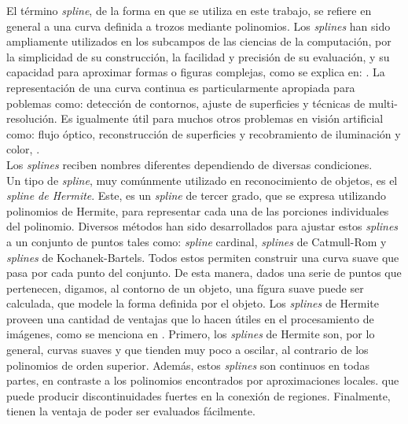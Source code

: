El t\'ermino \emph{spline}, de la forma en que se utiliza en este trabajo, se refiere en general 
a una curva definida a trozos mediante polinomios. Los \emph{splines} han sido ampliamente
utilizados en los subcampos de las ciencias de la computaci\'on, por la simplicidad de su 
construcci\'on, la facilidad y precisi\'on de su evaluaci\'on, y su capacidad para aproximar
formas o figuras complejas, como se explica en: \cite{web:splines}. 
La representaci\'on de una curva continua es particularmente apropiada para poblemas
como: detecci\'on de contornos, ajuste de superficies y t\'ecnicas de multi-resoluci\'on.
Es igualmente \'util para muchos otros problemas en visi\'on artificial como: flujo \'optico,
reconstrucci\'on de superficies y recobramiento de iluminaci\'on y color, \cite[821]{splinespap}.\\

Los \emph{splines} reciben nombres diferentes dependiendo de diversas condiciones.\\
Un tipo de \emph{spline}, muy com\'unmente utilizado en reconocimiento de objetos, es
el \emph{spline de Hermite}. Este, es un \emph{spline} de tercer grado, que se expresa
 utilizando polinomios de Hermite, para representar cada una de las porciones individuales
del polinomio.
Diversos m\'etodos han sido desarrollados para ajustar estos \emph{splines} a un conjunto
de puntos tales como: \emph{spline} cardinal, \emph{splines} de Catmull-Rom y \emph{splines} de
Kochanek-Bartels. Todos estos permiten construir una curva suave que pasa por cada punto
del conjunto. De esta manera, dados una serie de puntos que pertenecen, digamos, al contorno de 
un objeto, una f\'igura suave puede ser calculada, que modele la forma definida por el objeto.
Los \emph{splines} de Hermite proveen una cantidad de ventajas que lo hacen \'utiles 
en el procesamiento de im\'agenes, como se menciona en \cite{splinespap}. Primero,
los \emph{splines} de Hermite son, por lo general, curvas suaves y que tienden muy poco
a oscilar, al contrario de los polinomios de orden superior. Adem\'as, estos \emph{splines} son
continuos en todas partes, en contraste a los polinomios encontrados por aproximaciones locales.
que puede producir discontinuidades fuertes en la 
conexi\'on de regiones. Finalmente, tienen la ventaja de poder ser evaluados f\'acilmente.
